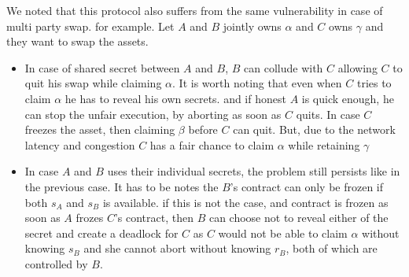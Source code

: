 \documentclass[manuscript,screen,review]{acmart}
\begin{document}
	We noted that this protocol also suffers from the same vulnerability in case of multi party swap. for example. Let $A$ and $B$ jointly owns $\alpha$ and $C$ owns $\gamma$ and they want to swap the assets. 	
	\begin{itemize}
		\item In case of shared secret between $A$ and $B$, $B$ can collude with $C$ allowing $C$ to quit his swap while claiming $\alpha$. It is worth noting that even when $C$ tries to claim $\alpha$ he has to reveal his own secrets. and if honest $A$ is quick enough, he can stop the unfair execution, by aborting as soon as $C$ quits. In case $C$ freezes the asset, then claiming $\beta$ before $C$ can quit. But, due to the network latency and congestion $C$ has a fair chance to claim $\alpha$ while retaining $\gamma$
		\item In case $A$ and $B$ uses their individual secrets, the problem still persists like in the previous case. 
		It has to be notes the $B$'s contract can only be frozen if both $s_A$ and $s_B$ is available. if this is not the case, and contract is frozen as soon as $A$ frozes $C$'s contract, then $B$ can choose not to reveal either of the secret and create a deadlock for $C$ as $C$ would not be able to claim $\alpha$ without knowing $s_B$ and she cannot abort without knowing $r_B$, both of which are controlled by $B$.
	\end{itemize}
\end{document}
